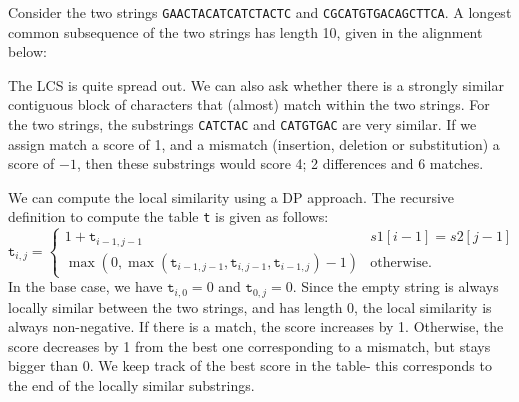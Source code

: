 \documentclass[a4paper, openany]{memoir}
\begin{document}
    Consider the two strings \texttt{GAACTACATCATCTACTC} and \texttt{CGCATGTGACAGCTTCA}. A longest common subsequence of the two strings has length 10, given in the alignment below:
    \begin{table}[H]
        \centering
    \end{table}
    \noindent The LCS is quite spread out. We can also ask whether there is a strongly similar contiguous block of characters that (almost) match within the two strings. For the two strings, the substrings \texttt{CATCTAC} and \texttt{CATGTGAC} are very similar. If we assign match a score of 1, and a mismatch (insertion, deletion or substitution) a score of $-1$, then these substrings would score 4; 2 differences and 6 matches.

    We can compute the local similarity using a DP approach. The recursive definition to compute the table \texttt{t} is given as follows:
    \[\texttt{t}_{i, j} = \begin{cases}
        1 + \texttt{t}_{i-1, j-1} & s1[i-1] = s2[j-1] \\
        \max(0, \max(\texttt{t}_{i-1, j-1}, \texttt{t}_{i, j-1}, \texttt{t}_{i-1, j}) - 1) & \text{otherwise}.
    \end{cases}\]
    In the base case, we have $\texttt{t}_{i, 0} = 0$ and $\texttt{t}_{0, j} = 0$. Since the empty string is always locally similar between the two strings, and has length 0, the local similarity is always non-negative. If there is a match, the score increases by 1. Otherwise, the score decreases by 1 from the best one corresponding to a mismatch, but stays bigger than 0. We keep track of the best score in the table- this corresponds to the end of the locally similar substrings.
\end{document}

